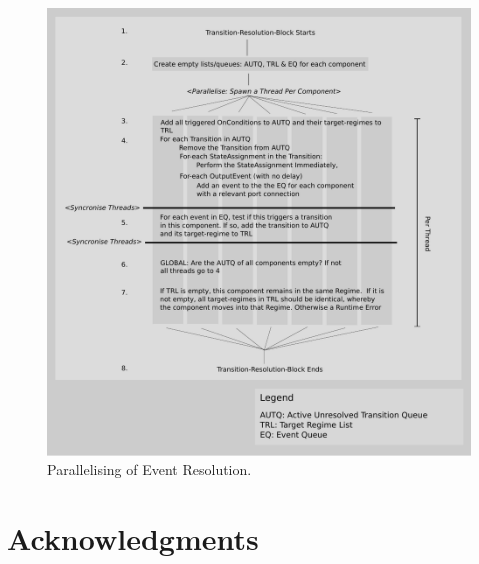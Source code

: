 \documentclass[draftspec]{ninemlspec}
\begin{document}
\begin{figure}[htb!]
\center
\includegraphics[width=14cm]{images/ParallelisingTransitions.pdf}
\protect\caption{Parallelising of Event Resolution.}
\label{ParallelisingTransitions}
\end{figure}

\section{Acknowledgments}




\clearpage
%

\end{document}
